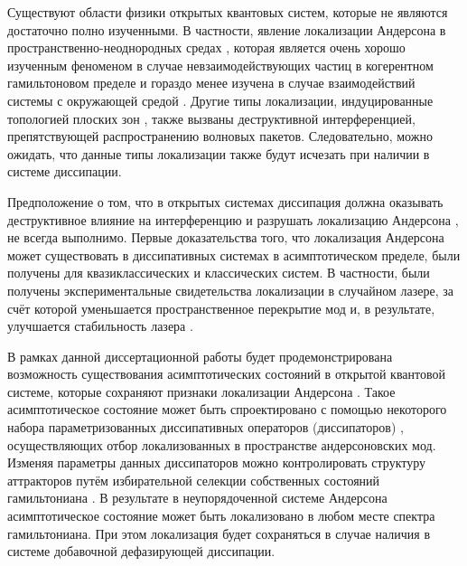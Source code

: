 Существуют области физики открытых квантовых систем, которые не являются достаточно полно изученными. В частности, явление локализации Андерсона в пространственно-неоднородных средах \autocite{Anderson1958, Kramer1993, Evers2008, Esposito2012}, которая является очень хорошо изученным феноменом в случае невзаимодействующих частиц в когерентном гамильтоновом пределе \autocite{Segev2013, Billy2008, Roati2008, Yedjour2010, Kondov2011, Jendrzejewski2012} и гораздо менее изучена в случае взаимодействий системы с окружающей средой \autocite{Breuer2007}. Другие типы локализации, индуцированные топологией плоских зон \autocite{Derzhko2006, Bergman2008, Flach2014}, также вызваны деструктивной интерференцией, препятствующей распространению волновых пакетов. Следовательно, можно ожидать, что данные типы локализации также будут исчезать при наличии в системе диссипации.

Предположение о том, что в открытых системах диссипация должна оказывать деструктивное влияние на интерференцию и разрушать локализацию Андерсона \autocite{Genway2014}, не всегда выполнимо.
Первые доказательства того, что локализация Андерсона может существовать в диссипативных системах в асимптотическом пределе, были получены для квазиклассических и классических систем. В частности, были получены экспериментальные свидетельства локализации в случайном лазере, за счёт которой уменьшается пространственное перекрытие мод и, в результате, улучшается стабильность лазера \autocite{Stano2012, Liu2014}.

В рамках данной диссертационной работы будет продемонстрирована возможность существования асимптотических состояний в открытой квантовой системе, которые сохраняют признаки локализации Андерсона \cite{Yusipov2017}. Такое асимптотическое состояние может быть спроектировано с помощью некоторого набора параметризованных диссипативных операторов (диссипаторов) \autocite{Diehl2008}, осуществляющих отбор локализованных в пространстве андерсоновских мод.
Изменяя параметры данных диссипаторов можно контролировать структуру аттракторов путём избирательной селекции собственных состояний гамильтониана \cite{Vershinina2017}. В результате в неупорядоченной системе Андерсона асимптотическое состояние может быть локализовано в любом месте спектра гамильтониана. При этом локализация будет сохраняться в случае наличия в системе добавочной дефазирующей диссипации.

